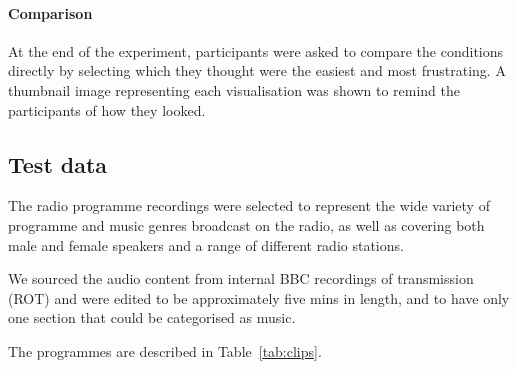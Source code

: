 \paragraph{Comparison}
At the end of the experiment, participants were asked to compare the conditions directly by selecting which they
thought were the easiest and most frustrating. A thumbnail image representing each visualisation was shown to remind
the participants of how they looked.


\subsection{Test data}
The radio programme recordings were selected to represent the wide variety of programme and music genres broadcast on
the radio, as well as covering both male and female speakers and a range of different radio stations.

We sourced the audio content from internal BBC recordings of transmission (ROT) and were edited to be approximately
five mins in length, and to have only one section that could be categorised as music.

The programmes are described in Table~\ref{tab:clips}.

